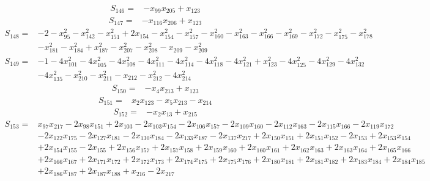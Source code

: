 \begin{align*}
S_{146}={}&-x_{99}x_{205}+x_{123}
\end{align*}
\begin{align*}
S_{147}={}&-x_{116}x_{206}+x_{123}
\end{align*}
\begin{align*}
S_{148}={}&-2-x_{95}^{2}-x_{142}^{2}-x_{151}^{2}+2x_{154}-x_{154}^{2}-x_{157}^{2}-x_{160}^{2}-x_{163}^{2}-x_{166}^{2}-x_{169}^{2}-x_{172}^{2}-x_{175}^{2}-x_{178}^{2}\\
{}&-x_{181}^{2}-x_{184}^{2}+x_{187}^{2}-x_{207}^{2}-x_{208}^{2}-x_{209}-x_{209}^{2}
\end{align*}
\begin{align*}
S_{149}={}&-1-4x_{101}^{2}-4x_{105}^{2}-4x_{108}^{2}-4x_{111}^{2}-4x_{114}^{2}-4x_{118}^{2}-4x_{121}^{2}+x_{123}^{2}-4x_{125}^{2}-4x_{129}^{2}-4x_{132}^{2}\\
{}&-4x_{135}^{2}-x_{210}^{2}-x_{211}^{2}-x_{212}-x_{212}^{2}-4x_{214}^{2}
\end{align*}
\begin{align*}
S_{150}={}&-x_{4}x_{213}+x_{123}
\end{align*}
\begin{align*}
S_{151}={}&x_{2}x_{123}-x_{5}x_{213}-x_{214}
\end{align*}
\begin{align*}
S_{152}={}&-x_{2}x_{13}+x_{215}
\end{align*}
\begin{align*}
S_{153}={}&x_{97}x_{217}-2x_{98}x_{151}+2x_{103}-2x_{103}x_{154}-2x_{106}x_{157}-2x_{109}x_{160}-2x_{112}x_{163}-2x_{115}x_{166}-2x_{119}x_{172}\\
{}&-2x_{122}x_{175}-2x_{127}x_{181}-2x_{130}x_{184}-2x_{133}x_{187}-2x_{137}x_{217}+2x_{150}x_{151}+2x_{151}x_{152}-2x_{153}+2x_{153}x_{154}\\
{}&+2x_{154}x_{155}-2x_{155}+2x_{156}x_{157}+2x_{157}x_{158}+2x_{159}x_{160}+2x_{160}x_{161}+2x_{162}x_{163}+2x_{163}x_{164}+2x_{165}x_{166}\\
{}&+2x_{166}x_{167}+2x_{171}x_{172}+2x_{172}x_{173}+2x_{174}x_{175}+2x_{175}x_{176}+2x_{180}x_{181}+2x_{181}x_{182}+2x_{183}x_{184}+2x_{184}x_{185}\\
{}&+2x_{186}x_{187}+2x_{187}x_{188}+x_{216}-2x_{217}
\end{align*}
